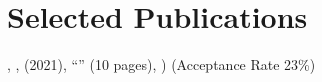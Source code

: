 
\section*{Selected Publications}


\begin{etaremune}
\item{
  \label{ACSOS21}
  \underline{}, , (2021), %
  ``'' (10 pages), %
  \emph{})
  (Acceptance Rate 23\%)
}

\end{etaremune}